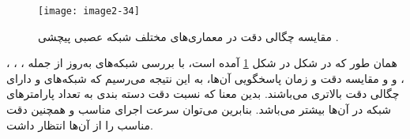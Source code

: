 \begin{figure}[h]
	\centering
	\texttt{[image: image2-34]}
	\caption{
		مقایسه چگالی دقت در معماری‌های مختلف شبکه عصبی پیچشی 
		\cite{Bianco_2018}.}
	\label{image2-34}
\end{figure}

\noindent
همان طور که در شکل در شکل \ref{image2-34} آمده است، با بررسی شبکه‌های به‌روز از جمله
 ،
 ،
 ،
 ،
و
و مقایسه دقت و زمان پاسخگویی آن‌ها، به این نتیجه می‌رسیم که شبکه‌های  و  دارای چگالی دقت بالاتری می‌باشند. بدین معنا که نسبت دقت دسته بندی به تعداد پارامترهای شبکه در آن‌ها بیشتر می‌باشد. بنابرین می‌توان سرعت اجرای مناسب و همچنین دقت مناسب را از آن‌ها انتظار داشت. 

